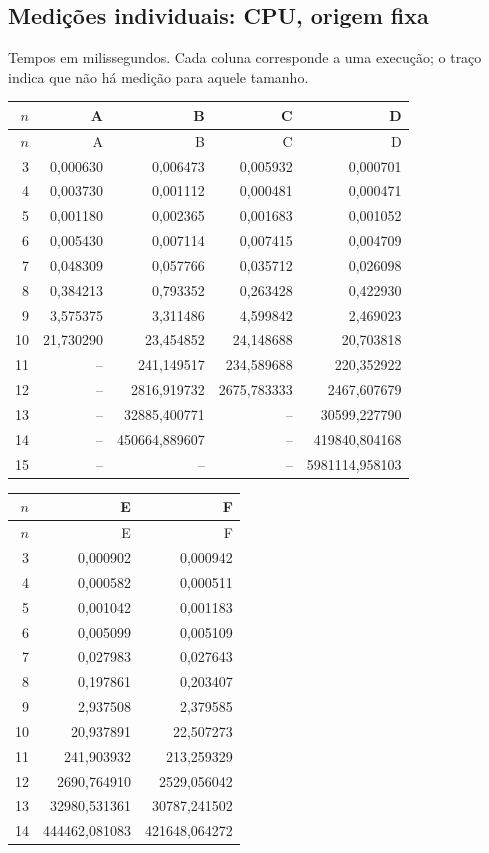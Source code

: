 \subsection{Medições individuais: CPU, origem fixa}
Tempos em milissegundos. Cada coluna corresponde a uma execução; o traço indica que não há medição para aquele tamanho.
\begingroup\small\setlength{\tabcolsep}{4pt}
\begin{longtable}{rrrrr}
\toprule
$n$ & A & B & C & D \\
\midrule\endfirsthead
\toprule $n$ & A & B & C & D \\
\midrule\endhead
3 & 0,000630 & 0,006473 & 0,005932 & 0,000701 \\
4 & 0,003730 & 0,001112 & 0,000481 & 0,000471 \\
5 & 0,001180 & 0,002365 & 0,001683 & 0,001052 \\
6 & 0,005430 & 0,007114 & 0,007415 & 0,004709 \\
7 & 0,048309 & 0,057766 & 0,035712 & 0,026098 \\
8 & 0,384213 & 0,793352 & 0,263428 & 0,422930 \\
9 & 3,575375 & 3,311486 & 4,599842 & 2,469023 \\
10 & 21,730290 & 23,454852 & 24,148688 & 20,703818 \\
11 & -- & 241,149517 & 234,589688 & 220,352922 \\
12 & -- & 2816,919732 & 2675,783333 & 2467,607679 \\
13 & -- & 32885,400771 & -- & 30599,227790 \\
14 & -- & 450664,889607 & -- & 419840,804168 \\
15 & -- & -- & -- & 5981114,958103 \\
\bottomrule
\end{longtable}
\endgroup
\begingroup\small\setlength{\tabcolsep}{4pt}
\begin{longtable}{rrr}
\toprule
$n$ & E & F \\
\midrule\endfirsthead
\toprule $n$ & E & F \\
\midrule\endhead
3 & 0,000902 & 0,000942 \\
4 & 0,000582 & 0,000511 \\
5 & 0,001042 & 0,001183 \\
6 & 0,005099 & 0,005109 \\
7 & 0,027983 & 0,027643 \\
8 & 0,197861 & 0,203407 \\
9 & 2,937508 & 2,379585 \\
10 & 20,937891 & 22,507273 \\
11 & 241,903932 & 213,259329 \\
12 & 2690,764910 & 2529,056042 \\
13 & 32980,531361 & 30787,241502 \\
14 & 444462,081083 & 421648,064272 \\
\bottomrule
\end{longtable}
